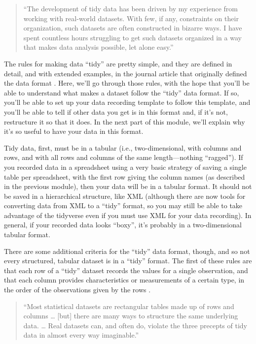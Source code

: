 \documentclass[]{tufte-book}
\begin{document}
\begin{quote}
``The development of tidy data has been driven by my experience from working
with real-world datasets. With few, if any, constraints on their organization,
such datasets are often constructed in bizarre ways. I have spent countless
hours struggling to get such datasets organized in a way that makes data
analysis possible, let alone easy.'' \citep{wickham2014tidy}
\end{quote}

The rules for making data ``tidy'' are pretty simple, and they are defined in
detail, and with extended examples, in the journal article that originally
defined the data format \citep{wickham2014tidy}. Here, we'll go through those rules, with
the hope that you'll be able to understand what makes a dataset follow the
``tidy'' data format. If so, you'll be able to set up your data recording
template to follow this template, and you'll be able to tell if other data you
get is in this format and, if it's not, restructure it so that it does. In
the next part of this module, we'll explain why it's so useful to have your
data in this format.

Tidy data, first, must be in a tabular (i.e., two-dimensional, with columns and
rows, and with all rows and columns of the same length---nothing ``ragged''). If
you recorded data in a spreadsheet using a very basic strategy of saving a
single table per spreadsheet, with the first row giving the column names (as
described in the previous module), then your data will be in a tabular format.
It should not be saved in a hierarchical structure, like XML (although there are
now tools for converting data from XML to a ``tidy'' format, so you may still be
able to take advantage of the tidyverse even if you must use XML for your data
recording). In general, if your recorded data looks ``boxy'', it's probably in a
two-dimensional tabular format.

There are some additional criteria for the ``tidy'' data format, though, and so
not every structured, tabular dataset is in a ``tidy'' format. The first of these
rules are that each row of a ``tidy'' dataset records the values for a single
observation, and that each column provides characteristics or measurements of a
certain type, in the order of the observations given by the rows \citep{wickham2014tidy}.

\begin{quote}
``Most statistical datasets are rectangular tables made up of rows and columns
\ldots{} {[}but{]} there are many ways to structure the same underlying data. \ldots{}
Real datasets can, and often do, violate the three precepts of tidy data in
almost every way imaginable.'' \citep{wickham2014tidy}
\end{quote}
\end{document}
